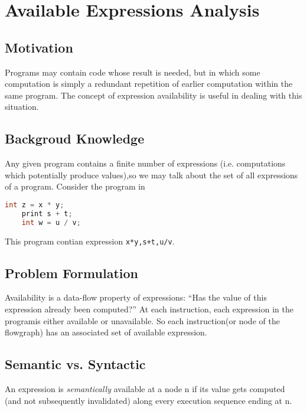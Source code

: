 \section{Available Expressions Analysis}

\subsection{Motivation}

Programs may contain code whose result is needed, but in which some computation is simply a redundant 
repetition of earlier computation within the same program. The concept of expression availability is useful in dealing with this situation.


\subsection{Backgroud Knowledge}

Any given program contains a finite number of expressions (i.e. computations which potentially 
produce values),so we may talk about the set of all expressions of a program. Consider the program in 




\begin{lstlisting}[language=C,frame=single, caption=An ,label = lst:expression1]
    int z = x * y; 
    print s + t; 
    int w = u / v;
\end{lstlisting}


This program contian expression \texttt{x*y,s+t,u/v}.



\subsection{Problem Formulation}


Availability is a data-flow property of expressions: “Has the value of this expression already been computed?”
At each instruction, each expression in the programis either available or unavailable. So each instruction(or node of the flowgraph) has 
an associated set of available expression. 



\subsection{Semantic vs. Syntactic}

An expression is \textit{semantically} available at a node n if its value gets computed 
(and not subsequently invalidated) along every execution sequence ending at n.

